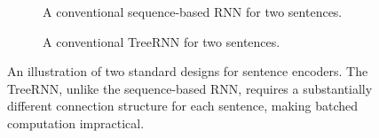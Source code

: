 
\begin{figure}[t]

\begin{subfigure}[t]{\columnwidth}
\begin{center}
\end{center}


\caption{\label{fig:batching:good}A conventional sequence-based RNN for two sentences.}
\end{subfigure}

\begin{subfigure}[t]{\columnwidth}
\begin{center}
\end{center}

\caption{\label{fig:batching:bad}A conventional TreeRNN for two sentences.}
\end{subfigure}

\caption{\label{fig:batching} An illustration of two standard designs for sentence encoders. The TreeRNN, unlike the sequence-based RNN, requires a substantially different connection structure for each sentence, making batched computation impractical.}
\end{figure}

